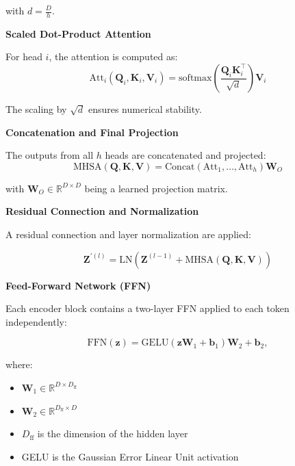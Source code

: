 with $d = \frac{D}{h}$.

\textbf{Scaled Dot-Product Attention}

For head \(i\), the attention is computed as:
\begin{equation}
  \text{Att}_i(\mathbf{Q}_i, \mathbf{K}_i, \mathbf{V}_i) = \text{softmax}\left(\frac{\mathbf{Q}_i \mathbf{K}_i^\top}{\sqrt{d}}\right) \mathbf{V}_i
\end{equation}

The scaling by \(\sqrt{d}\) ensures numerical stability.

\textbf{Concatenation and Final Projection}

The outputs from all \(h\) heads are concatenated and projected:
\begin{equation}
    \text{MHSA}(\mathbf{Q}, \mathbf{K}, \mathbf{V}) = \text{Concat}\left(\text{Att}_1, \dots, \text{Att}_h\right) \mathbf{W}_O
    \label{eq:mhsa}
\end{equation}

with \(\mathbf{W}_O \in \mathbb{R}^{D \times D}\) being a learned projection matrix.

\textbf{Residual Connection and Normalization}

A residual connection and layer normalization are applied:

\begin{equation}
\mathbf{Z}^{\prime(l)} = \text{LN}\left(\mathbf{Z}^{(l-1)} + \text{MHSA}(\mathbf{Q}, \mathbf{K}, \mathbf{V})\right)
\label{eq:residual}
\end{equation}

\textbf{Feed-Forward Network (FFN)}

Each encoder block contains a two-layer FFN applied to each token independently:

\begin{equation}
  \text{FFN}(\mathbf{z}) = \text{GELU}\left(\mathbf{z} \mathbf{W}_1 + \mathbf{b}_1\right) \mathbf{W}_2 + \mathbf{b}_2,
\end{equation}

where:
\begin{itemize}
  \item \(\mathbf{W}_1 \in \mathbb{R}^{D \times D_{\text{ff}}}\)
  \item \(\mathbf{W}_2 \in \mathbb{R}^{D_{\text{ff}} \times D}\)
  \item \(D_{\text{ff}}\) is the dimension of the hidden layer
  \item GELU is the Gaussian Error Linear Unit activation
\end{itemize}

